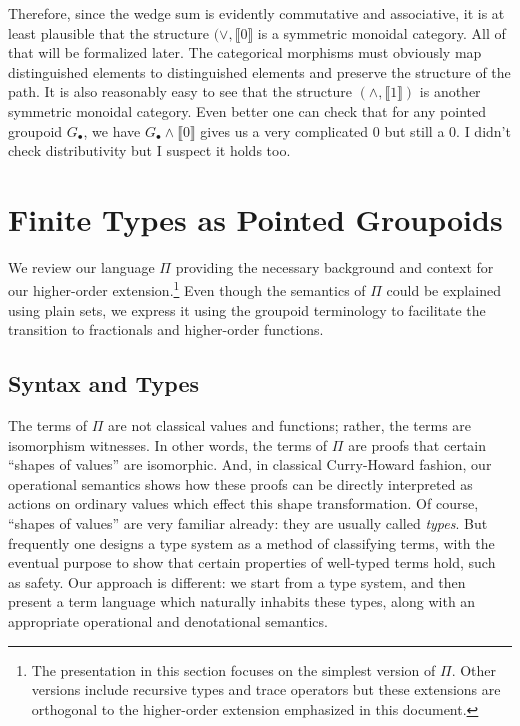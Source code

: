 \documentclass[11pt]{article}
\newcommand{\dt}[1]{\llbracket #1 \rrbracket}
\newcommand{\wedgesum}{\vee}
\newcommand{\smashproduct}{\wedge}
\begin{document}
Therefore, since the wedge sum is evidently commutative and associative, it
is at least plausible that the structure $(\wedgesum, \dt{0}$ is a symmetric
monoidal category. All of that will be formalized later. The categorical
morphisms must obviously map distinguished elements to distinguished elements
and preserve the structure of the path. It is also reasonably easy to see
that the structure $(\smashproduct, \dt{1})$ is another symmetric monoidal
category. Even better one can check that for any pointed groupoid
$G_\bullet$, we have $G_\bullet \smashproduct \dt{0}$ gives us a very
complicated 0 but still a 0. I didn't check distributivity but I suspect it
holds too.

\section{Finite Types as Pointed Groupoids} 

We review our language $\Pi$ providing the necessary background and context
for our higher-order extension.\footnote{The presentation in this section
  focuses on the simplest version of $\Pi$. Other versions include recursive
  types and trace operators but these extensions are orthogonal to the
  higher-order extension emphasized in this document.} Even though the
semantics of $\Pi$ could be explained using plain sets, we express it using
the groupoid terminology to facilitate the transition to fractionals and
higher-order functions. 

\subsection{Syntax and Types} 

The terms of $\Pi$ are not classical values and functions; rather, the terms
are isomorphism witnesses.  In other words, the terms of $\Pi$ are proofs
that certain ``shapes of values'' are isomorphic.  And, in classical
Curry-Howard fashion, our operational semantics shows how these proofs can be
directly interpreted as actions on ordinary values which effect this shape
transformation. Of course, ``shapes of values'' are very familiar already:
they are usually called \emph{types}.  But frequently one designs a type
system as a method of classifying terms, with the eventual purpose to show
that certain properties of well-typed terms hold, such as safety.  Our
approach is different: we start from a type system, and then present a term
language which naturally inhabits these types, along with an appropriate
operational and denotational semantics.
\end{document}
